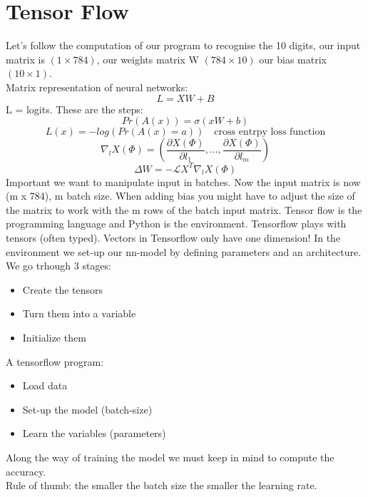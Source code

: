 \section{Tensor Flow}
Let's follow the computation of our program to recognise the 10 digits, our input matrix is $(1 \times 784)$, our weights matrix W $(784 \times 10)$ our bias matrix $(10 \times 1)$.\\
Matrix representation of neural networks:
\[ 
     L = XW + B
\]L = logits. These are the steps:\[ 
    Pr(A(x)) = \sigma(xW +b) 
\]
\[ 
    L(x) = -log(Pr(A(x)=a)) \quad \text{cross entrpy loss function}
\]
\[ 
    \nabla_l X(\Phi) = \left( \frac{\partial X(\Phi)}{\partial l_1}, \ldots, \frac{\partial X(\Phi)}{\partial l_m} \right) 
\]
\[ 
    \Delta W = -\mathcal{L}X^T\nabla_l X(\Phi) 
\]
Important we want to manipulate input in batches. Now the input matrix is now (m x 784), m batch size. When adding bias you might have to adjust the size of the matrix to work with the m rows of the batch input matrix. Tensor flow is the programming language and Python is the environment. Tensorflow plays with tensors (often typed). Vectors in Tensorflow only have one dimension! In the environment we set-up our nn-model by defining parameters and an architecture. We go trhough 3 stages: 
\begin{itemize}
    \item Create the tensors
    \item Turn them into a variable
    \item Initialize them
\end{itemize}
A tensorflow program:
\begin{itemize}
    \item Load data
    \item Set-up the model (batch-size)
    \item Learn the variables (parameters)
\end{itemize}
Along the way of training the model we must keep in mind to compute the accuracy.\\ Rule of thumb: the smaller the batch size the smaller the learning rate.\\

